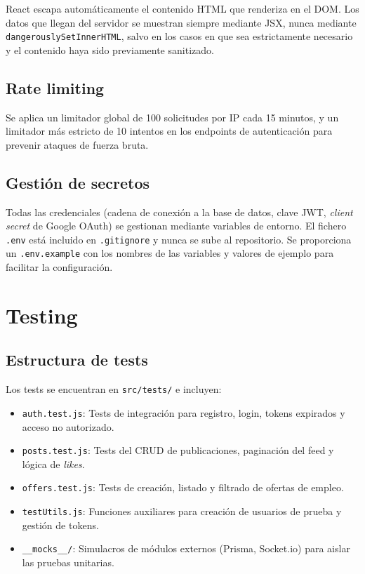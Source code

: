 \documentclass[a4paper]{report}
\begin{document}
React escapa automáticamente el contenido HTML que renderiza en el DOM. Los datos que llegan del servidor se muestran siempre mediante JSX, nunca mediante \texttt{dangerouslySetInnerHTML}, salvo en los casos en que sea estrictamente necesario y el contenido haya sido previamente sanitizado.

\subsection{Rate limiting}

Se aplica un limitador global de 100 solicitudes por IP cada 15 minutos, y un limitador más estricto de 10 intentos en los endpoints de autenticación para prevenir ataques de fuerza bruta.

\subsection{Gestión de secretos}

Todas las credenciales (cadena de conexión a la base de datos, clave JWT, \textit{client secret} de Google OAuth) se gestionan mediante variables de entorno. El fichero \texttt{.env} está incluido en \texttt{.gitignore} y nunca se sube al repositorio. Se proporciona un \texttt{.env.example} con los nombres de las variables y valores de ejemplo para facilitar la configuración.

\section{Testing}

\subsection{Estructura de tests}

Los tests se encuentran en \texttt{src/tests/} e incluyen:

\begin{itemize}
  \item \texttt{auth.test.js}: Tests de integración para registro, login, tokens expirados y acceso no autorizado.
  \item \texttt{posts.test.js}: Tests del CRUD de publicaciones, paginación del feed y lógica de \textit{likes}.
  \item \texttt{offers.test.js}: Tests de creación, listado y filtrado de ofertas de empleo.
  \item \texttt{testUtils.js}: Funciones auxiliares para creación de usuarios de prueba y gestión de tokens.
  \item \texttt{\_\_mocks\_\_/}: Simulacros de módulos externos (Prisma, Socket.io) para aislar las pruebas unitarias.
\end{itemize}
\end{document}
